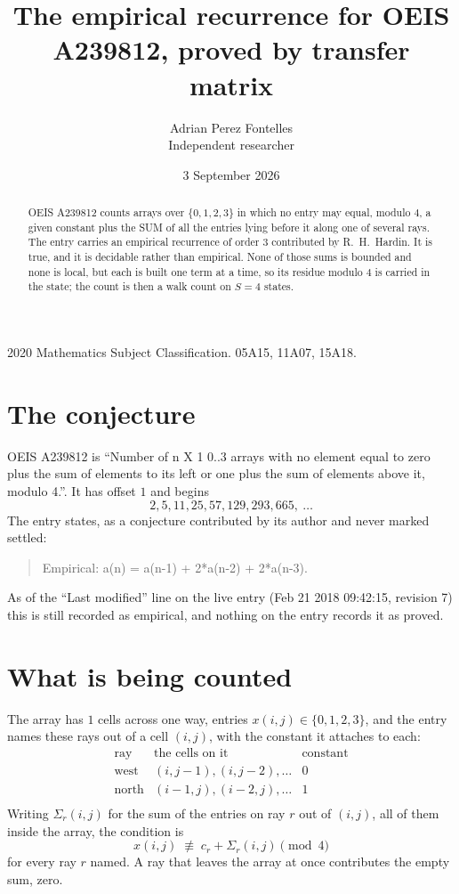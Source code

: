 \documentclass[11pt,a4paper]{article}
\title{The empirical recurrence for OEIS A239812, proved by transfer matrix}
\author{Adrian Perez Fontelles\\ \small Independent researcher}
\date{3 September 2026}
\theoremstyle{plain}
\theoremstyle{definition}
\begin{document}
\maketitle

\begin{abstract}
OEIS A239812 counts arrays over $\{0,1,2,3\}$ in which no entry may equal, modulo $4$, a given
constant plus the SUM of all the entries lying before it along one of several rays. The entry
carries an empirical recurrence of order $3$ contributed by R.~H.~Hardin. It is true, and
it is decidable rather than empirical. None of those sums is bounded and none is local, but
each is built one term at a time, so its residue modulo $4$ is carried in the state; the
count is then a walk count on $S=4$ states.
\end{abstract}

\noindent\small 2020 Mathematics Subject Classification. 05A15, 11A07, 15A18.\normalsize

\section{The conjecture}

OEIS A239812 is ``Number of n X 1 0..3 arrays with no element equal to zero plus the sum of elements to its left or one plus the sum of elements above it, modulo 4.''. It has offset $1$ and begins
\[
2, 5, 11, 25, 57, 129, 293, 665,\ \dots
\]
The entry states, as a conjecture contributed by its author and never marked settled:
\begin{quote}
Empirical: a(n) = a(n-1) + 2*a(n-2) + 2*a(n-3).
\end{quote}
As of the ``Last modified'' line on the live entry (Feb 21 2018 09:42:15, revision 7) this is still
recorded as empirical, and nothing on the entry records it as proved.

\section{What is being counted}

The array has $1$ cells across one way, entries $x(i,j)\in\{0,1,2,3\}$, and the entry names these
rays out of a cell $(i,j)$, with the constant it attaches to each:
\[
\begin{array}{lll}
\text{ray} & \text{the cells on it} & \text{constant} \\[2pt]
\text{west} & (i,j-1),(i,j-2),\dots & 0 \\
\text{north} & (i-1,j),(i-2,j),\dots & 1 \\
\end{array}
\]
Writing $\Sigma_r(i,j)$ for the sum of the entries on ray $r$ out of $(i,j)$, all of them
inside the array, the condition is
\[
x(i,j)\;\not\equiv\;c_r+\Sigma_r(i,j) \pmod{4}
\]
for every ray $r$ named. A ray that leaves the array at once contributes the empty sum,
zero.
\end{document}
